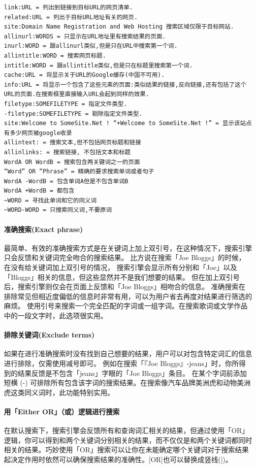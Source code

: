 \documentclass{book}
\begin{document}
\begin{lstlisting}
link:URL = 列出到链接到目标URL的网页清单.
related:URL = 列出于目标URL地址有关的网页.
site:Domain Name Registration and Web Hosting 搜索区域仅限于目标网站.
allinurl:WORDS = 只显示在URL地址里有搜索结果的页面.
inurl:WORD = 跟allinurl类似,但是只在URL中搜索第一个词.
allintitle:WORD = 搜索网页标题.
intitle:WORD = 跟allintitle类似,但是只在标题里搜索第一个词.
cache:URL = 将显示关于URL的Google缓存(中国不可用).
info:URL = 将显示一个包含了这些元素的页面:类似结果的链接,反向链接,还有包括了这个URL的页面.在搜索框里直接输入URL会起到同样的效果.
filetype:SOMEFILETYPE = 指定文件类型.
-filetype:SOMEFILETYPE = 剔除指定文件类型.
site:Welcome to SomeSite.Net ! “+Welcome to SomeSite.Net !” = 显示该站点有多少网页被google收录
allintext: = 搜索文本,但不包括网页标题和链接
allinlinks: = 搜索链接, 不包括文本和标题
WordA OR WordB = 搜索包含两关键词之一的页面
“Word” OR “Phrase” = 精确的要求搜索单词或者句子
WordA -WordB = 包含单词A但是不包含单词B
WordA +WordB = 都包含
~WORD = 寻找此单词和它的同义词
~WORD-WORD = 只搜索同义词,不要原词
\end{lstlisting}

\paragraph{准确搜索(Exact phrase)}
最简单、有效的准确搜索方式是在关键词上加上双引号，在这种情况下，搜索引擎只会反馈和关键词完全吻合的搜索结果。
比方说在搜索「Joe Bloggs」的时候，在没有给关键词加上双引号的情况，
搜索引擎会显示所有分别和「Joe」以及「Bloggs」相关的信息，但这些显然并不是我们想要的结果。
但在加上双引号后，搜索引擎则仅会在页面上反馈和「Joe Bloggs」相吻合的信息。
准确搜索在排除常见但相近度偏低的信息时非常有用，可以为用户省去再度对结果进行筛选的麻烦。
使用引号来搜索一个完全匹配的字词或一组字词。在搜索歌词或文学作品中的一段文字时，此选项很实用。

\paragraph{排除关键词(Exclude terms)}
如果在进行准确搜索时没有找到自己想要的结果，用户可以对包含特定词汇的信息进行排除，仅需使用减号即可。
例如在搜索「『Joe Bloggs』-jeans」时，你所得到的结果反馈是不包含「jeans」字眼的「Joe Bloggs」条目。
在某个字词前添加短横 (-) 可排除所有包含该字词的搜索结果。在搜索像汽车品牌美洲虎和动物美洲虎这类同义词时，此功能特别实用。

\paragraph{用「Either OR」（或）逻辑进行搜索}
在默认搜索下，搜索引擎会反馈所有和查询词汇相关的结果，但通过使用「OR」逻辑，你可以得到和两个关键词分别相关的结果，而不仅仅是和两个关键词都同时相关的结果。巧妙使用「OR」搜索可以让你在未能确定哪个关键词对于搜索结果起决定作用时依然可以确保搜索结果的准确性。[OR]也可以替换成竖线(|)。
\end{document}

